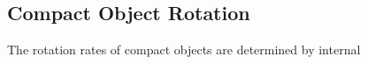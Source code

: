 {\color{orange}

\subsection{Compact Object Rotation}

The rotation rates of compact objects are determined by internal 

}